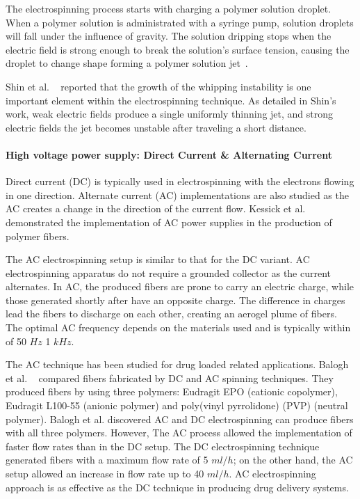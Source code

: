 \documentclass[5p,,preprint,12pt,twocolumn]{elsarticle}
\begin{document}
The electrospinning process starts with charging a polymer solution droplet. When a polymer solution is administrated with a syringe pump, solution droplets will fall under the influence of gravity. The solution dripping stops when the electric field is strong enough to break the solution's surface tension, causing the droplet to change shape forming a polymer solution jet\unskip~\cite{527120:12033655}.

Shin et al. \unskip~\cite{527120:13659926} reported that the growth of the whipping instability is one important element within the electrospinning technique. As detailed in Shin's work, weak electric fields produce a single uniformly thinning jet, and strong electric fields the jet becomes unstable after traveling a short distance.



\paragraph{High voltage power supply: Direct Current \& Alternating Current}Direct current (DC) is typically used in electrospinning with the electrons flowing in one direction. Alternate current (AC) implementations are also studied as the AC creates a change in the direction of the current flow. Kessick et al.\unskip~\cite{527120:13444381} demonstrated the implementation of AC power supplies in the production of polymer fibers.

The AC electrospinning setup is similar to that for the DC variant. AC electrospinning apparatus do not require a grounded collector as the current alternates. In AC, the produced fibers are prone to carry an electric charge, while those generated shortly after have an opposite charge. The difference in charges lead the fibers to discharge on each other, creating an aerogel plume of fibers. The optimal AC frequency depends on the materials used and is typically within of 50 $Hz $ {\textendash} 1 $kHz $. \unskip~\cite{527120:13443405}

The AC technique has been studied for drug loaded related applications. Balogh et al. \unskip~\cite{527120:13445177} compared fibers fabricated by DC and AC spinning techniques. They produced fibers by using three polymers: Eudragit EPO (cationic copolymer), Eudragit L100-55 (anionic polymer) and poly(vinyl pyrrolidone) (PVP) (neutral polymer). Balogh et al. discovered AC and DC electrospinning can produce fibers with all three polymers. However, The AC process allowed the implementation of faster flow rates than in the DC setup. The DC electrospinning technique generated fibers with a maximum flow rate of 5 $ml/h $; on the other hand, the AC setup allowed an increase in flow rate up to 40 $ml/h $. AC electrospinning approach is as effective as the DC technique in producing drug delivery systems.
\end{document}
